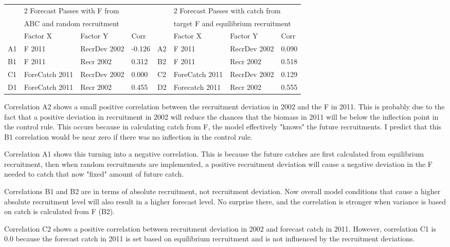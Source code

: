 \begin{center}
	\begin{longtable}{p{0.4cm} p{2.75cm} p{3cm} p{1cm} p{0.4cm} p{2.75cm} p{2cm} p{1cm}}
		\hline
		 & \multicolumn{3}{l}{2 Forecast Passes with F from} & & \multicolumn{3}{l}{2 Forecast Passes with catch from}\\
		 & \multicolumn{3}{l}{ABC and random recruitment} & & \multicolumn{3}{l}{target F and equilibrium recruitment}\\
		\hline
		 & Factor X & Factor Y & Corr &  & Factor X & Factor Y & Corr \\
		 \hline
		 A1 & F 2011 & RecrDev 2002 & -0.126 & A2 & F 2011 & RecrDev 2002 & 0.090 \\
		 B1 & F 2011 & Recr 2002    &  0.312 & B2 & F 2011 & Recr    2002 & 0.518 \\
		 C1 & ForeCatch 2011 & RecrDev 2002 & 0.000 & C2 & ForeCatch 2011 & RecrDev 2002 & 0.129 \\
		 D1 & ForeCatch 2011 & Recr 2002    & 0.455 & D2 & Forecatch 2011 & Recr 2002    & 0.555 \\
		 \hline		
	\end{longtable}
\end{center}

Correlation A2 shows a small positive correlation between the recruitment deviation in 2002 and the F in 2011.  This is probably due to the fact that a positive deviation in recruitment in 2002 will reduce the chances that the biomass in 2011 will be below the inflection point in the control rule.  This occurs because in calculating catch from F, the model effectively "knows" the future recruitments.  I predict that this B1 correlation would be near zero if there was no inflection in the control rule.

Correlation A1 shows this turning into a negative correlation.  This is because the future catches are first calculated from equilibrium recruitment, then when random recruitments are implemented, a positive recruitment deviation will cause a negative deviation in the F needed to catch that now "fixed" amount of future catch.

Correlations B1 and B2 are in terms of absolute recruitment, not recruitment deviation.  Now overall model conditions that cause a higher absolute recruitment level will also result in a higher forecast level.  No surprise there, and the correlation is stronger when variance is based on catch is calculated from F (B2).

Correlation C2 shows a positive correlation between recruitment deviation in 2002 and forecast catch in 2011.  However, correlation C1 is 0.0 because the forecast catch in 2011 is set based on equilibrium recruitment and is not influenced by the recruitment deviations.

